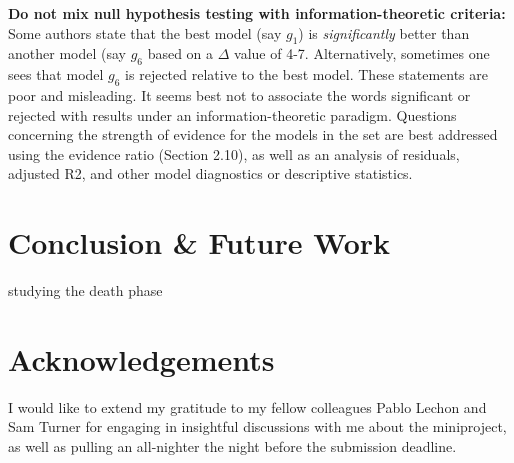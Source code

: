 \documentclass[11pt]{article}
\begin{document}
\begin{linenumbers}
	\par \textbf{Do not mix null hypothesis testing with information-theoretic criteria:}\\
	Some authors state that the best model (say $g_1$) is \emph{significantly} better than another model (say $g_6$ based on a $\Delta$ value of 4-7. Alternatively, sometimes one sees that model $g_6$ is rejected relative to the best model. These statements are poor and misleading. It seems best not to associate the words significant or rejected with results under an information-theoretic paradigm. Questions concerning the strength of evidence for the models in the set are best addressed using the evidence ratio (Section 2.10), as well as an analysis of residuals, adjusted R2, and other model diagnostics or descriptive statistics.

	\section{Conclusion \& Future Work}
	studying the death phase %
	
	\section{Acknowledgements}
	I would like to extend my gratitude to my fellow colleagues Pablo Lechon and Sam Turner for engaging in insightful discussions with me about the miniproject, as well as pulling an all-nighter the night before the submission deadline.
	
	\end{linenumbers}

	
    
\end{document}
